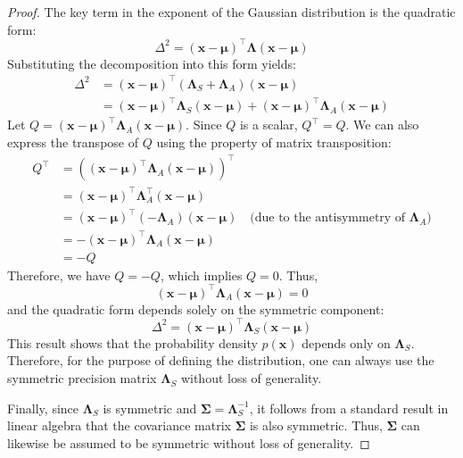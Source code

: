 \documentclass[../main.tex]{subfiles}
\begin{document}
\begin{proof}
The key term in the exponent of the Gaussian distribution is the quadratic form:
\begin{equation*}
\Delta^2 = (\mathbf{x} - \boldsymbol{\mu})^\top \boldsymbol{\Lambda} (\mathbf{x} - \boldsymbol{\mu})
\end{equation*}
Substituting the decomposition into this form yields:
\begin{align*}
\Delta^2 &= (\mathbf{x} - \boldsymbol{\mu})^\top (\boldsymbol{\Lambda}_S + \boldsymbol{\Lambda}_A) (\mathbf{x} - \boldsymbol{\mu}) \\
&= (\mathbf{x} - \boldsymbol{\mu})^\top \boldsymbol{\Lambda}_S (\mathbf{x} - \boldsymbol{\mu}) + (\mathbf{x} - \boldsymbol{\mu})^\top \boldsymbol{\Lambda}_A (\mathbf{x} - \boldsymbol{\mu})
\end{align*}
Let $Q = (\mathbf{x} - \boldsymbol{\mu})^\top \boldsymbol{\Lambda}_A (\mathbf{x} - \boldsymbol{\mu})$. Since $Q$ is a scalar, $Q^\top = Q$. We can also express the transpose of $Q$ using the property of matrix transposition:
\begin{align*}
Q^\top &= \left( (\mathbf{x} - \boldsymbol{\mu})^\top \boldsymbol{\Lambda}_A (\mathbf{x} - \boldsymbol{\mu}) \right)^\top \\
&= (\mathbf{x} - \boldsymbol{\mu})^\top \boldsymbol{\Lambda}_A^\top (\mathbf{x} - \boldsymbol{\mu}) \\
&= (\mathbf{x} - \boldsymbol{\mu})^\top (-\boldsymbol{\Lambda}_A) (\mathbf{x} - \boldsymbol{\mu}) \quad \text{(due to the antisymmetry of $\boldsymbol{\Lambda}_A$)} \\
&= - (\mathbf{x} - \boldsymbol{\mu})^\top \boldsymbol{\Lambda}_A (\mathbf{x} - \boldsymbol{\mu}) \\
&= -Q
\end{align*}
Therefore, we have $Q = -Q$, which implies $Q = 0$. Thus,
\begin{equation*}
(\mathbf{x} - \boldsymbol{\mu})^\top \boldsymbol{\Lambda}_A (\mathbf{x} - \boldsymbol{\mu}) = 0
\end{equation*}
and the quadratic form depends solely on the symmetric component:
\begin{equation*}
\Delta^2 = (\mathbf{x} - \boldsymbol{\mu})^\top \boldsymbol{\Lambda}_S (\mathbf{x} - \boldsymbol{\mu})
\end{equation*}
This result shows that the probability density $p(\mathbf{x})$ depends only on $\boldsymbol{\Lambda}_S$. Therefore, for the purpose of defining the distribution, one can always use the symmetric precision matrix $\boldsymbol{\Lambda}_S$ without loss of generality.

Finally, since $\boldsymbol{\Lambda}_S$ is symmetric and $\boldsymbol{\Sigma} = \boldsymbol{\Lambda}_S^{-1}$, it follows from a standard result in linear algebra that the covariance matrix $\boldsymbol{\Sigma}$ is also symmetric. Thus, $\boldsymbol{\Sigma}$ can likewise be assumed to be symmetric without loss of generality.

\end{proof}
\end{document}
